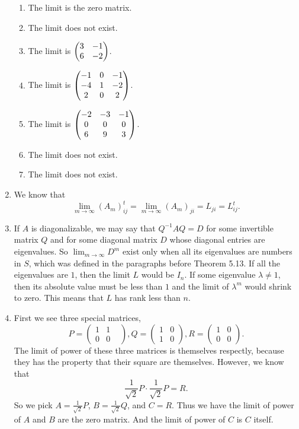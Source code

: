 \begin{enumerate}
\begin{enumerate}
\item The limit is the zero matrix.
\item The limit does not exist.
\item The limit is $\begin{pmatrix}3 & -1\cr 6 & -2\end{pmatrix}$.
\item The limit is $\begin{pmatrix}-1 & 0 & -1\cr -4 & 1 & -2\cr 2 & 0 & 2\end{pmatrix}$.
\item The limit is $\begin{pmatrix}-2 & -3 & -1\cr 0 & 0 & 0\cr 6 & 9 & 3\end{pmatrix}$.
\item The limit does not exist.
\item The limit does not exist.
\end{enumerate}
\item We know that 
\[\lim_{m\rightarrow \infty}(A_m)^t_{ij}=\lim_{m\rightarrow \infty}(A_m)_{ji}=L_{ji}=L^t_{ij}.\]
\item If $A$ is diagonalizable, we may say that $Q^{-1}AQ=D$ for some invertible matrix $Q$ and for some diagonal matrix $D$ whose diagonal entries are eigenvalues. So $\lim_{m\rightarrow \infty}D^m$ exist only when all its eigenvalues are numbers in $S$, which was defined in the paragraphs before Theorem 5.13. If all the eigenvalues are $1$, then the limit $L$ would be $I_n$. If some eigenvalue $\lambda \neq 1$, then its absolute value must be less than $1$ and the limit of $\lambda^m$ would shrink to zero. This means that $L$ has rank less than $n$. 
\item First we see three special matrices, 
\[P=\begin{pmatrix}1&1&\\0&0\end{pmatrix}, Q=\begin{pmatrix}1&0\\1&0\end{pmatrix}, R=\begin{pmatrix}1&0\\0&0\end{pmatrix}.\]
The limit of power of these three matrices is themselves respectly, because they has the property that their square are themselves. However, we know that 
\[\frac{1}{\sqrt{2}}P\cdot \frac{1}{\sqrt{2}}P=R.\]
So we pick $A=\frac{1}{\sqrt{2}}P$, $B=\frac{1}{\sqrt{2}}Q$, and $C=R$. Thus we have the limit of power of $A$ and $B$ are the zero matrix. And the limit of power of $C$ is $C$ itself.

\end{enumerate}
